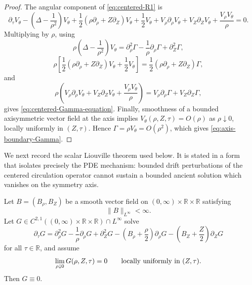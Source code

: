 \begin{proof}
The angular component of \eqref{eq:centered-R1} is
\[
   \partial_\tau V_\theta
   -\left(\Delta-\frac1{\rho^2}\right)V_\theta
   +\frac12(\rho\partial_\rho+Z\partial_Z)V_\theta
   +\frac12V_\theta
   +V_\rho\partial_\rho V_\theta+V_Z\partial_ZV_\theta
   +\frac{V_\rho V_\theta}{\rho}=0 .
\]
Multiplying by \(\rho\), using
\[
   \rho\left(\Delta-\frac1{\rho^2}\right)V_\theta
   =\partial_\rho^2\Gamma-\frac1\rho\partial_\rho\Gamma+
      \partial_Z^2\Gamma,
\]
\[
   \rho\left[\frac12(\rho\partial_\rho+Z\partial_Z)V_\theta
      +\frac12V_\theta\right]
   =\frac12(\rho\partial_\rho+Z\partial_Z)\Gamma,
\]
and
\[
   \rho\left(V_\rho\partial_\rho V_\theta+V_Z\partial_ZV_\theta
      +\frac{V_\rho V_\theta}{\rho}\right)
   =V_\rho\partial_\rho\Gamma+V_Z\partial_Z\Gamma,
\]
gives \eqref{eq:centered-Gamma-equation}.  Finally, smoothness of a bounded
axisymmetric vector field at the axis implies \(V_\theta(\rho,Z,\tau)=O(\rho)\)
as \(\rho\downarrow0\), locally uniformly in \((Z,\tau)\).  Hence
\(\Gamma=\rho V_\theta=O(\rho^2)\), which gives
\eqref{eq:axis-boundary-Gamma}.
\end{proof}

We next record the scalar Liouville theorem used below.  It is stated in a
form that isolates precisely the PDE mechanism: bounded drift perturbations of
the centered circulation operator cannot sustain a bounded ancient solution
which vanishes on the symmetry axis.

\begin{lemma}
\label{lem:axis-absorption-liouville}
Let \(B=(B_\rho,B_Z)\) be a smooth vector field on
\((0,\infty)\times\mathbb R\times\mathbb R\) satisfying
\[
   \|B\|_{L^\infty}<\infty .
\]
Let \(G\in C^{2,1}((0,\infty)\times\mathbb R\times\mathbb R)\cap L^\infty\)
solve
\begin{equation}\label{eq:abstract-Gamma-equation}
   \partial_\tau G
   =
   \partial_\rho^2G-\frac1\rho\partial_\rho G+
      \partial_Z^2G
   -\left(B_\rho+\frac\rho2\right)\partial_\rho G
   -\left(B_Z+\frac Z2\right)\partial_ZG
\end{equation}
for all \(\tau\in\mathbb R\), and assume
\begin{equation}\label{eq:abstract-axis-zero}
   \lim_{\rho\downarrow0}G(\rho,Z,\tau)=0
   \qquad\hbox{locally uniformly in }(Z,\tau).
\end{equation}
Then \(G\equiv0\).
\end{lemma}


